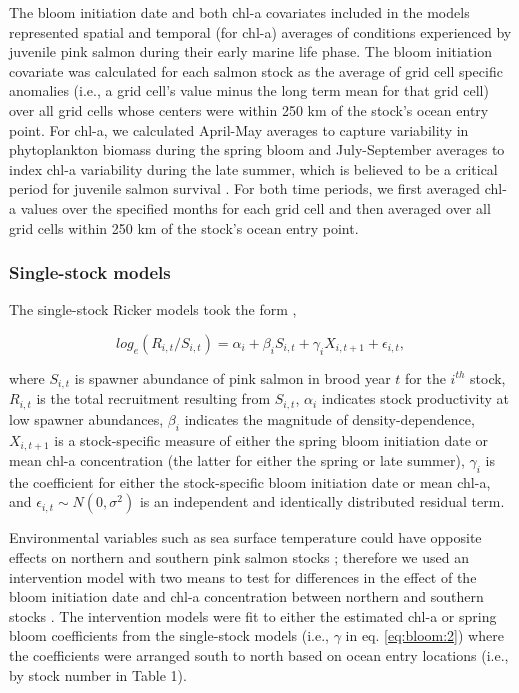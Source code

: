 The bloom initiation date and both chl-a covariates included in the models
represented spatial and temporal (for chl-a) averages of conditions experienced
by juvenile pink salmon during their early marine life phase. The bloom
initiation covariate was calculated for each salmon stock as the average of grid
cell specific anomalies (i.e., a grid cell's value minus the long term mean for
that grid cell) over all grid cells whose centers were within 250 km of the
stock's ocean entry point. For chl-a, we calculated April-May averages to
capture variability in phytoplankton biomass during the spring bloom and
July-September averages to index chl-a variability during the late summer, which
is believed to be a critical period for juvenile salmon survival
\citep{Beamish2001a, Moss2005a}. For both time periods, we first averaged chl-a
values over the specified months for each grid cell and then averaged over all
grid cells within 250 km of the stock's ocean entry point.

\subsubsection{Single-stock models}

The single-stock Ricker models took the form \citep{Adkison1996b},

\begin{equation}
log_e(R_{i,t} / S_{i,t}) = \alpha_i + \beta_i S_{i,t} + \gamma_i
X_{i,t+1} + \epsilon_{i,t}, \label{eq:bloom:2}
\end{equation}

\noindent
where \(S_{i,t}\) is spawner abundance of pink salmon in brood year \(t\) for
the \(i^{th}\) stock, \(R_{i,t}\) is the total recruitment resulting from
\(S_{i,t}\), \(\alpha_i\) indicates stock productivity at low spawner
abundances, \(\beta_i\) indicates the magnitude of density-dependence,
\(X_{i,t+1}\) is a stock-specific measure of either the spring bloom initiation
date or mean chl-a concentration (the latter for either the spring or late
summer), \(\gamma_i\) is the coefficient for either the stock-specific bloom
initiation date or mean chl-a, and \(\epsilon_{i,t} \sim N(0, \sigma^2)\) is an
independent and identically distributed residual term.

Environmental variables such as sea surface temperature could have opposite
effects on northern and southern pink salmon stocks \citep{Mueter2002a,
Su2004a}; therefore we used an intervention model with two means
\citep{Chatfield2004, Mueter2002a} to test for differences in the effect of the
bloom initiation date and chl-a concentration between northern and southern
stocks \citep{Chatfield2004, Mueter2002a}. The intervention models were fit to
either the estimated chl-a or spring bloom coefficients from the single-stock
models (i.e., \(\gamma\) in eq. \ref{eq:bloom:2}) where the coefficients were
arranged south to north based on ocean entry locations (i.e., by stock number in
Table 1).


